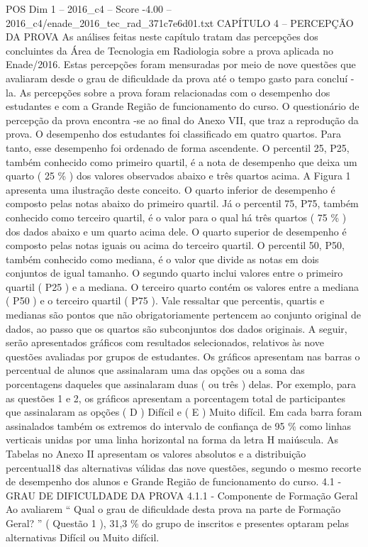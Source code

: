 \begin{textsample}{POS Dim 1 – 2016\_c4 – Score -4.00 – 2016\_c4/enade\_2016\_tec\_rad\_371c7e6d01.txt}  \label{ex:f1_pos_288}
CAPÍTULO 4 – PERCEPÇÃO DA PROVA As análises feitas neste capítulo tratam das percepções dos concluintes da Área de Tecnologia em Radiologia sobre a prova aplicada no Enade/2016.
Estas percepções foram mensuradas por meio de nove questões que avaliaram desde o grau de dificuldade da prova até o tempo gasto para concluí -la.
As percepções sobre a prova foram relacionadas com o desempenho dos estudantes e com a Grande Região de funcionamento do curso.
O questionário de percepção da prova encontra -se ao final do Anexo VII, que traz a reprodução da prova.
O desempenho dos estudantes foi classificado em quatro quartos.
Para tanto, esse desempenho foi ordenado de forma ascendente.
O percentil 25, P25, também conhecido como primeiro quartil, é a nota de desempenho que deixa um quarto ( 25 \% ) dos valores observados abaixo e três quartos acima.
A Figura 1 apresenta uma ilustração deste conceito.
O quarto inferior de desempenho é composto pelas notas abaixo do primeiro quartil.
Já o percentil 75, P75, também conhecido como terceiro quartil, é o valor para o qual há três quartos ( 75 \% ) dos dados abaixo e um quarto acima dele.
O quarto superior de desempenho é composto pelas notas iguais ou acima do terceiro quartil.
O percentil 50, P50, também conhecido como mediana, é o valor que divide as notas em dois conjuntos de igual tamanho.
O segundo quarto inclui valores entre o primeiro quartil ( P25 ) e a mediana.
O terceiro quarto contém os valores entre a mediana ( P50 ) e o terceiro quartil ( P75 ).
Vale ressaltar que percentis, quartis e medianas são pontos que não obrigatoriamente pertencem ao conjunto original de dados, ao passo que os quartos são subconjuntos dos dados originais.
A seguir, serão apresentados gráficos com resultados selecionados, relativos às nove questões avaliadas por grupos de estudantes.
Os gráficos apresentam nas barras o percentual de alunos que assinalaram uma das opções ou a soma das porcentagens daqueles que assinalaram duas ( ou três ) delas.
Por exemplo, para as questões 1 e 2, os gráficos apresentam a porcentagem total de participantes que assinalaram as opções ( D ) Difícil e ( E ) Muito difícil.
Em cada barra foram assinalados também os extremos do intervalo de confiança de 95 \% como linhas verticais unidas por uma linha horizontal na forma da letra H maiúscula.
As Tabelas no Anexo II apresentam os valores absolutos e a distribuição percentual18 das alternativas válidas das nove questões, segundo o mesmo recorte de desempenho dos alunos e Grande Região de funcionamento do curso. 4.1 - GRAU DE DIFICULDADE DA PROVA 4.1.1 - Componente de Formação Geral Ao avaliarem “ Qual o grau de dificuldade desta prova na parte de Formação Geral? ” ( Questão 1 ), 31,3 \% do grupo de inscritos e presentes optaram pelas alternativas Difícil ou Muito difícil.

\end{textsample}
